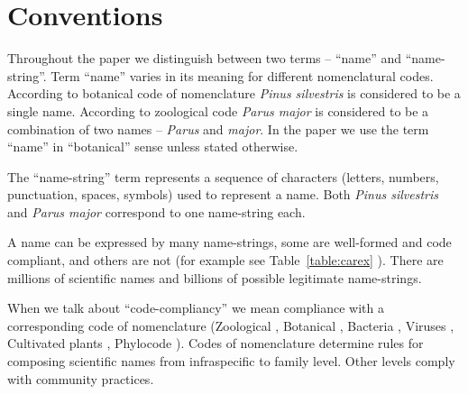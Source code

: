 \documentclass{bmcart}
\begin{document}


\section*{Conventions}

Throughout the paper we distinguish between two terms -- ``name'' and
``name-string''. Term ``name'' varies in its meaning for different
nomenclatural codes. According to botanical code of nomenclature \cite{ICN}
\textit{Pinus silvestris} is considered to be a single name. According to
zoological code \cite{ICZN} \textit{Parus major} is considered to be a
combination of two names -- \textit{Parus} and \textit{major}. In the paper we
use the term ``name'' in ``botanical'' sense unless stated otherwise.

The ``name-string'' term represents a sequence of characters (letters, numbers,
punctuation, spaces, symbols) used to represent a name. Both \textit{Pinus
silvestris} and \textit{Parus major} correspond to one name-string each.

A name can be expressed by many name-strings, some are well-formed and code
compliant, and others are not (for example see Table~\ref{table:carex} ). There
are millions of scientific names and billions of possible legitimate
name-strings.

When we talk about ``code-compliancy'' we mean compliance with a corresponding
code of nomenclature (Zoological \cite{ICZN}, Botanical \cite{ICN},
Bacteria \cite{ICNB}, Viruses \cite{ICTV}, Cultivated plants \cite{ICNCP},
Phylocode \cite{ICPN}). Codes of nomenclature determine rules for composing
scientific names from infraspecific to family level. Other levels comply with
community practices.
\end{document}
